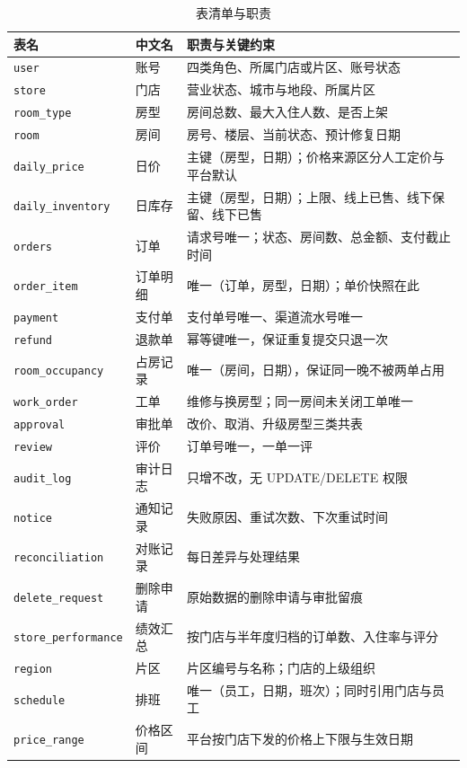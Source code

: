 \begin{table}[H]
\centering
\caption{表清单与职责}
\tabfont
\begin{tabularx}{\textwidth}{@{}p{3.3cm}p{2.4cm}X@{}}
\toprule
表名 & 中文名 & 职责与关键约束 \\
\midrule
\texttt{user} & 账号 & 四类角色、所属门店或片区、账号状态 \\
\texttt{store} & 门店 & 营业状态、城市与地段、所属片区 \\
\texttt{room\_type} & 房型 & 房间总数、最大入住人数、是否上架 \\
\texttt{room} & 房间 & 房号、楼层、当前状态、预计修复日期 \\
\texttt{daily\_price} & 日价 & 主键（房型，日期）；价格来源区分人工定价与平台默认 \\
\texttt{daily\_inventory} & 日库存 & 主键（房型，日期）；上限、线上已售、线下保留、线下已售 \\
\texttt{orders} & 订单 & 请求号唯一；状态、房间数、总金额、支付截止时间 \\
\texttt{order\_item} & 订单明细 & 唯一（订单，房型，日期）；单价快照在此 \\
\texttt{payment} & 支付单 & 支付单号唯一、渠道流水号唯一 \\
\texttt{refund} & 退款单 & 幂等键唯一，保证重复提交只退一次 \\
\texttt{room\_occupancy} & 占房记录 & 唯一（房间，日期），保证同一晚不被两单占用 \\
\texttt{work\_order} & 工单 & 维修与换房型；同一房间未关闭工单唯一 \\
\midrule
\texttt{approval} & 审批单 & 改价、取消、升级房型三类共表 \\
\texttt{review} & 评价 & 订单号唯一，一单一评 \\
\texttt{audit\_log} & 审计日志 & 只增不改，无 UPDATE/DELETE 权限 \\
\texttt{notice} & 通知记录 & 失败原因、重试次数、下次重试时间 \\
\texttt{reconciliation} & 对账记录 & 每日差异与处理结果 \\
\texttt{delete\_request} & 删除申请 & 原始数据的删除申请与审批留痕 \\
\texttt{store\_performance} & 绩效汇总 & 按门店与半年度归档的订单数、入住率与评分 \\
\midrule
\texttt{region} & 片区 & 片区编号与名称；门店的上级组织 \\
\texttt{schedule} & 排班 & 唯一（员工，日期，班次）；同时引用门店与员工 \\
\texttt{price\_range} & 价格区间 & 平台按门店下发的价格上下限与生效日期 \\
\bottomrule
\end{tabularx}
\end{table}

